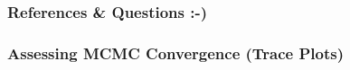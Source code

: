 \documentclass[11pt]{beamer}
\begin{document}
    \begin{frame}
        \frametitle{References \& Questions :-)}
        \tiny
        
        
    \end{frame}

    \begin{frame}
    \end{frame}

    \begin{frame}
        \frametitle{Assessing MCMC Convergence (Trace Plots)}
            \vspace*{0.3cm}
            \centering{
             \newline
            \vspace*{-1cm}
            
        }
    \end{frame}


\end{document}
